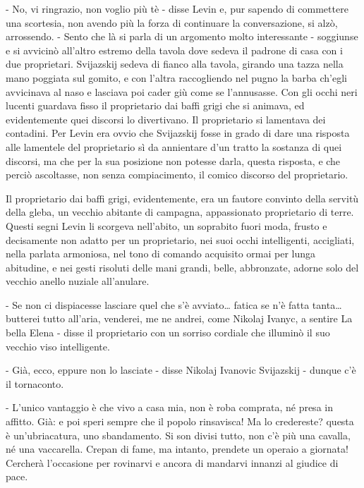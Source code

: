 - No, vi ringrazio, non voglio più tè - disse Levin e, pur sapendo di commettere una scortesia, non avendo più la forza di continuare la conversazione, si alzò, arrossendo. - Sento che là si parla di un argomento molto interessante - soggiunse e si avvicinò all'altro estremo della tavola dove sedeva il padrone di casa con i due proprietari. Svijazskij sedeva di fianco alla tavola, girando una tazza nella mano poggiata sul gomito, e con l'altra raccogliendo nel pugno la barba ch'egli avvicinava al naso e lasciava poi cader giù come se l'annusasse. Con gli occhi neri lucenti guardava fisso il proprietario dai baffi grigi che si animava, ed evidentemente quei discorsi lo divertivano. Il proprietario si lamentava dei contadini. Per Levin era ovvio che Svijazskij fosse in grado di dare una risposta alle lamentele del proprietario sì da annientare d'un tratto la sostanza di quei discorsi, ma che per la sua posizione non potesse darla, questa risposta, e che perciò ascoltasse, non senza compiacimento, il comico discorso del proprietario. 

Il proprietario dai baffi grigi, evidentemente, era un fautore convinto della servitù della gleba, un vecchio abitante di campagna, appassionato proprietario di terre. Questi segni Levin li scorgeva nell'abito, un soprabito fuori moda, frusto e decisamente non adatto per un proprietario, nei suoi occhi intelligenti, accigliati, nella parlata armoniosa, nel tono di comando acquisito ormai per lunga abitudine, e nei gesti risoluti delle mani grandi, belle, abbronzate, adorne solo del vecchio anello nuziale all'anulare. 

\label{xxvii-2} 

- Se non ci dispiacesse lasciare quel che s'è avviato\ldots{} fatica se n'è fatta tanta\ldots{} butterei tutto all'aria, venderei, me ne andrei, come Nikolaj Ivanyc, a sentire La bella Elena - disse il proprietario con un sorriso cordiale che illuminò il suo vecchio viso intelligente. 

- Già, ecco, eppure non lo lasciate - disse Nikolaj Ivanovic Svijazskij - dunque c'è il tornaconto. 

- L'unico vantaggio è che vivo a casa mia, non è roba comprata, né presa in affitto. Già: e poi speri sempre che il popolo rinsavisca! Ma lo credereste? questa è un'ubriacatura, uno sbandamento. Si son divisi tutto, non c'è più una cavalla, né una vaccarella. Crepan di fame, ma intanto, prendete un operaio a giornata! Cercherà l'occasione per rovinarvi e ancora di mandarvi innanzi al giudice di pace. 

